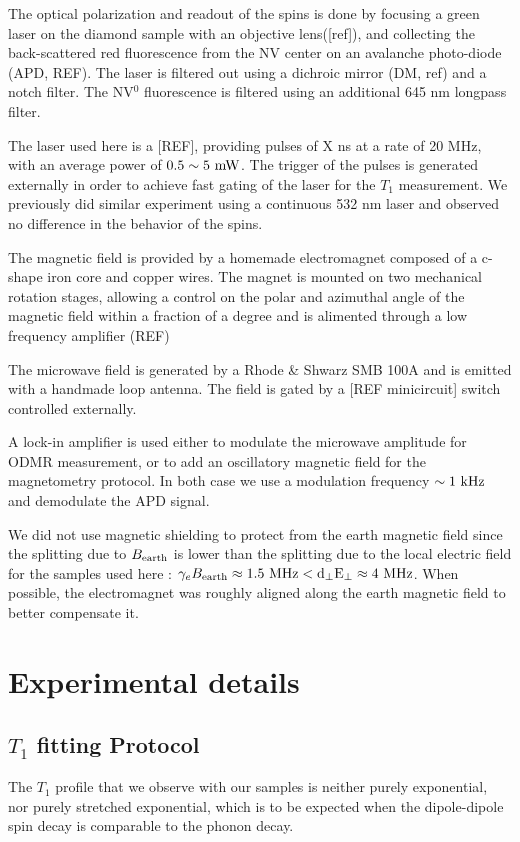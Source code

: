 \documentclass[preprintnumbers,amsmath,amssymb,onecolumn,12pt]{revtex4-2}\usepackage{graphicx}%
\begin{document}
The optical polarization and readout of the spins is done by focusing a green laser on the diamond sample with an objective lens([ref]), and collecting the back-scattered red fluorescence from the NV center on an avalanche photo-diode (APD, REF). The laser is filtered out using a dichroic mirror (DM, ref) and a notch filter. The NV$^0$ fluorescence is filtered using an additional 645 nm longpass filter.

The laser used here is a [REF], providing pulses of X ns at a rate of 20 MHz, with an average power of $0.5 \sim 5\ \rm mW$. The trigger of the pulses is generated externally in order to achieve fast  gating of the laser for the $T_1$ measurement. We previously did similar experiment using a continuous 532 nm laser and observed no difference in the behavior of the spins.

The magnetic field is provided by a homemade electromagnet composed of a c-shape iron core and  copper wires. The magnet is mounted on two mechanical rotation stages, allowing a control on the polar and azimuthal angle of the magnetic field within a fraction of a degree and is alimented through a low frequency amplifier (REF)

The microwave field is generated by a Rhode \& Shwarz SMB 100A and is emitted with a handmade loop antenna. The field is gated by a [REF minicircuit] switch controlled externally.

A lock-in amplifier is used either to modulate the microwave amplitude for ODMR measurement, or to add an oscillatory magnetic field for the magnetometry protocol. In both case we use a modulation frequency $\sim 1\ \rm kHz$ and demodulate the APD signal.

We did not use magnetic shielding to protect from the earth magnetic field since the splitting due to  $B_{\rm earth}$ is lower than the splitting due to the local electric field for the samples used here : $ \gamma_e B_{\rm earth} \approx 1.5\ \rm MHz < d_\perp E_\perp \approx 4\ \rm MHz$. 
When possible, the electromagnet was roughly aligned along the earth magnetic field to better compensate it.
\section{Experimental details}
\subsection{$T_1$ fitting Protocol}
The $T_1$ profile that we observe with our samples is neither purely exponential, nor purely stretched exponential, which is to be expected when the dipole-dipole spin decay is comparable to the phonon decay.
\end{document}
